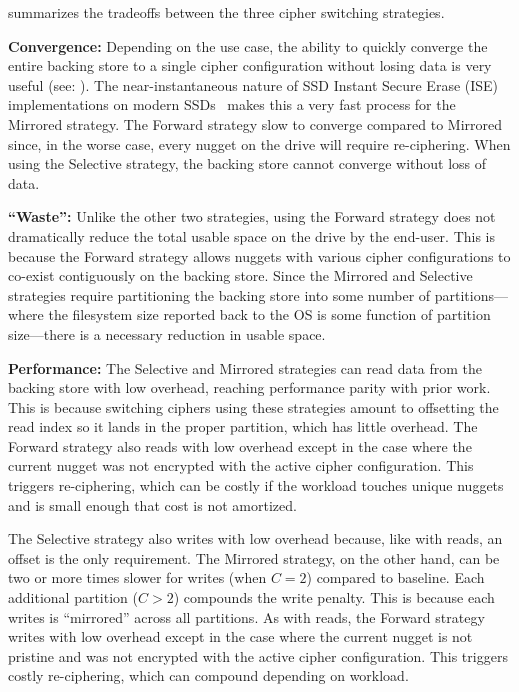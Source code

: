  summarizes the tradeoffs between the three cipher
switching strategies.

\textbf{Convergence:} Depending on the use case, the ability to quickly converge
the entire backing store to a single cipher configuration without losing data is
very useful (see: ). The near-instantaneous nature of SSD
Instant Secure Erase (ISE) implementations on modern SSDs~\cite{ISE1,ISE2,ISE3}
makes this a very fast process for the Mirrored strategy. The Forward strategy
slow to converge compared to Mirrored since, in the worse case, every nugget on
the drive will require re-ciphering. When using the Selective strategy, the
backing store cannot converge without loss of data.

\textbf{``Waste'':} Unlike the other two strategies, using
the Forward strategy does not dramatically reduce the total usable space on the
drive by the end-user. This is because the Forward strategy allows nuggets with
various cipher configurations to co-exist contiguously on the backing store.
Since the Mirrored and Selective strategies require partitioning the backing
store into some number of partitions---where the filesystem size reported back
to the OS is some function of partition size---there is a necessary reduction in
usable space.

\textbf{Performance:} The Selective and Mirrored strategies can read data
from the backing store with low overhead, reaching performance parity with prior
work. This is because switching ciphers using these strategies amount to
offsetting the read index so it lands in the proper partition, which has little
overhead. The Forward strategy also reads with low overhead except in the case
where the current nugget was not encrypted with the active cipher configuration.
This triggers re-ciphering, which can be costly if the workload touches unique
nuggets and is small enough that cost is not amortized.

The Selective strategy also writes with low overhead because, like with reads,
an offset is the only requirement. The Mirrored strategy, on the other hand, can
be two or more times slower for writes (when $C = 2$) compared to baseline. Each
additional partition ($C > 2$) compounds the write penalty. This is because each
writes is ``mirrored'' across all partitions. As with reads, the Forward
strategy writes with low overhead except in the case where the current nugget is
not pristine and was not encrypted with the active cipher configuration. This
triggers costly re-ciphering, which can compound depending on workload.

